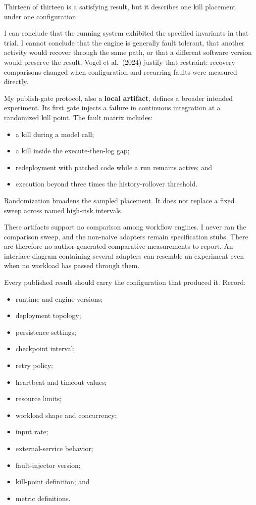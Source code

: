 Thirteen of thirteen is a satisfying result, but it describes one kill placement under one configuration.

I can conclude that the running system exhibited the specified invariants in that trial. I cannot conclude that the engine is generally fault tolerant, that another activity would recover through the same path, or that a different software version would preserve the result. Vogel et al.~(2024) justify that restraint: recovery comparisons changed when configuration and recurring faults were measured directly.


My publish-gate protocol, also a \textbf{local artifact}, defines a broader intended experiment. Its first gate injects a failure in continuous integration at a randomized kill point. The fault matrix includes:

\begin{itemize}
\tightlist
\item
  a kill during a model call;
\item
  a kill inside the execute-then-log gap;
\item
  redeployment with patched code while a run remains active; and
\item
  execution beyond three times the history-rollover threshold.
\end{itemize}

Randomization broadens the sampled placement. It does not replace a fixed sweep across named high-risk intervals.

These artifacts support no comparison among workflow engines. I never ran the comparison sweep, and the non-naive adapters remain specification stubs. There are therefore no author-generated comparative measurements to report. An interface diagram containing several adapters can resemble an experiment even when no workload has passed through them.


Every published result should carry the configuration that produced it. Record:

\begin{itemize}
\tightlist
\item
  runtime and engine versions;
\item
  deployment topology;
\item
  persistence settings;
\item
  checkpoint interval;
\item
  retry policy;
\item
  heartbeat and timeout values;
\item
  resource limits;
\item
  workload shape and concurrency;
\item
  input rate;
\item
  external-service behavior;
\item
  fault-injector version;
\item
  kill-point definition; and
\item
  metric definitions.
\end{itemize}

